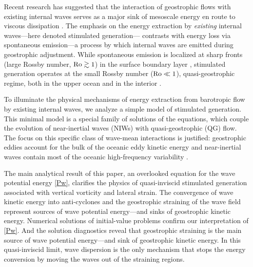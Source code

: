 \documentclass{jfm}
\begin{document}
Recent research has suggested that the interaction
of geostrophic flows with existing internal waves serves
as a major sink of mesoscale energy en route to viscous dissipation
\citep{xie_vanneste2015,taylor_straub2016,wagner_young2016,barkan_etal2016,shakespeare_hogg2017}.
The emphasis on the energy extraction by \textit{existing} internal waves---here
denoted stimulated generation---
contrasts with energy loss via spontaneous emission---a process
by which internal waves are emitted during geostrophic adjustment.
While spontaneous emission is localized
at sharp fronts (large Rossby number, $\mathrm{Ro}\gtrsim 1$) in the surface boundary
layer \citep[e.g., ][]{shakespeare_hogg2017}, stimulated generation operates at
the small Rossby number ($\mathrm{Ro}\ll 1$), quasi-geostrophic regime, both in the upper
ocean and in the interior \citep[e.g., ][]{xie_vanneste2015}.


To illuminate the physical mechanisms of energy extraction from
barotropic flow by existing internal waves, we analyze a
simple model of stimulated generation. This minimal model is a special
family of solutions of the \cite{xie_vanneste2015} equations, which couple the
evolution of near-inertial waves (NIWs) with quasi-geostrophic (QG) flow. The
focus on this specific class of wave-mean interactions is justified:  geostrophic
eddies account for the bulk of the oceanic eddy kinetic energy
\cite[$90\%$,][]{ferrari_wunsch2009} and near-inertial waves contain most of the
oceanic high-frequency variability \citep{alford_etal2016}.

The main analytical result of this paper, an overlooked equation for the wave potential
energy \eqref{Pw}, clarifies the physics of quasi-inviscid stimulated generation
associated with vertical vorticity and lateral strain. The convergence of wave
kinetic energy into anti-cyclones and the geostrophic straining of the wave field
represent sources of wave potential energy---and sinks of geostrophic kinetic energy.
Numerical solutions of
initial-value problems confirm our interpretation of \eqref{Pw}. And the solution
diagnostics reveal that geostrophic straining is the main source of wave potential
energy---and sink of geostrophic kinetic energy. In this quasi-inviscid limit,
wave dispersion is the only mechanism that stops the energy conversion by moving
the waves out of the straining regions.
\end{document}
